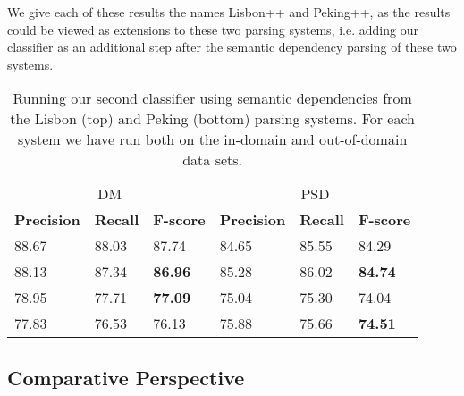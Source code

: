 We give each of these results the names Lisbon++ and Peking++, as the results could be viewed as extensions to these two parsing systems, i.e. adding our classifier as an additional step after the semantic dependency parsing of these two systems. 


\begin{table}
    \centering
    \smaller[0.2]
    \begin{tabular}{@{}llllll@{}}
        \toprule
        \multicolumn{3}{c}{DM}
        & \multicolumn{3}{c}{PSD} \\
        \textbf{Precision} & \textbf{Recall} & \textbf{F-score} & \textbf{Precision} & \textbf{Recall} & \textbf{F-score} \\
        \midrule
        88.67 & 88.03 & 87.74 & 84.65 & 85.55 & 84.29 \\
        88.13 & 87.34 & \textbf{86.96} & 85.28 & 86.02 & \textbf{84.74} \\
        \bottomrule
        78.95 & 77.71 & \textbf{77.09} & 75.04 & 75.30 & 74.04 \\
        77.83 & 76.53 & 76.13 & 75.88 & 75.66 & \textbf{74.51} \\
    \end{tabular}
    \caption{Running our second classifier using semantic dependencies from the Lisbon (top) and Peking (bottom) parsing systems. For each system we have run both on the in-domain and out-of-domain data sets.}
    \label{table:final_results_peking_lisbon}
\end{table}


\subsection{Comparative Perspective}
\label{results:comparisons}

